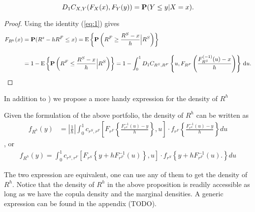 \begin{equation}
  \label{eq:1}
  D_1 C_{X,Y}(F_X(x), F_Y(y)) = {\bf P}(Y\leq y|X=x).
\end{equation}
\begin{proof}
  Using the identity (\ref{eq:1}) gives
  \begin{align*}
    F_{R^h}(x) &= \p(R^s - h R^F\leq x) %
                 = \operatorname{E}\left\{\p\left(R^F\geq \frac{R^S-x}{h}\Big|
                 R^S\right)\right\}\\[10pt]
               &= 1-\operatorname{E}\left\{\p\left(R^F\leq \frac{R^S-x}{h}\Big|
                 R^S\right)\right\}%
               = 1- \int_0^1 D_1 C_{R^S, R^F}\left\{u,
                 F_{R^F}\left(\frac{F^{(-1)}_{R^S}(u) -
                 x}{h}\right)\right\}\, \dd u.
  \end{align*}
\end{proof}\medskip

In addition to \cite{barbi2014copula}) we propose a more handy expression for the density of $R^h$

\begin{prop} Given the formulation of the above portfolio, the density of $R^h$ can be written as
  \begin{align}
  f_{R^h}(y) &= \left|\frac{1}{h}\right|\int_0^1 c_{r^S, r^F} \left[
  F_{r^F}\left\{\frac{F^{-1}_{r^S}(u)-y}{h}\right\}, u
  \right]
   \cdot
  f_{r^F}
  \left\{\frac{F^{-1}_{r^S}(u)-y}{h}\right\} du \label{eq:density1}
  \end{align}, or
    \begin{align}
      f_{R^h}(y)
      = \int_0^1 c_{r^S, r^F} \left[
      F_{r^S}\left\{y + h F^{-1}_{r^F}(u)\right\}, u
      \right]
       \cdot
      f_{r^S}
      \left\{
      y+ hF^{-1}_{r^F}(u).
      \right\} du\label{eq:density2}
  \end{align}
  \end{prop}
The two expression are equivalent, one can use any of them to get the density of $R^h$.
Notice that the density of $R^h$ in the above proposition is readily accessible as long as we have
the copula density and the marginal densities.
A generic expression can be found in the appendix (TODO).



